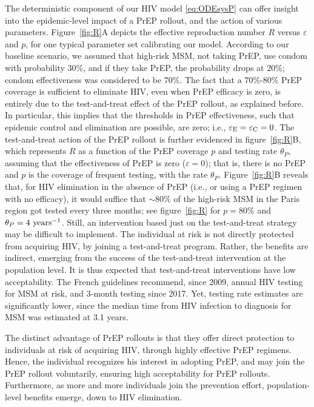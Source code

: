 \documentclass[11pt]{article}
\begin{document}
The deterministic component of our HIV model \eqref{eq:ODEsysP} can offer insight into the epidemic-level impact of a PrEP rollout, and the action of various parameters. Figure~\ref{fig:R}A depicts the effective reproduction number $R$ versus $\varepsilon$ and $p$, for one typical parameter set calibrating our model.  According to our baseline scenario, we assumed that high-risk MSM, not taking PrEP, use condom with probability $30\%$, and if they take PrEP, the probability drops at $20\%$; condom effectiveness was considered to be $70\%$. The fact that a $70\%$-$80\%$ PrEP coverage is sufficient to eliminate HIV, even when PrEP efficacy is zero, is entirely due to the test-and-treat effect of the PrEP rollout, as explained before. In particular, this implies that the thresholds in PrEP effectiveness, such that epidemic control and elimination are possible, are zero; i.e., $\varepsilon_{\rm E} = \varepsilon_{\rm C} = 0$. The test-and-treat action of the PrEP rollout is further evidenced in figure~\ref{fig:R}B, which represents $R$ as a function of the PrEP coverage $p$ and testing rate $\theta_P$, assuming that the effectiveness of PrEP is zero ($\varepsilon=0$); that is, there is no PrEP and $p$ is the coverage of frequent testing, with the rate $\theta_P$. Figure~\ref{fig:R}B reveals that, for HIV elimination in the absence of PrEP (i.e., or using a PrEP regimen with no efficacy), it would suffice that $\sim 80\%$ of the high-risk MSM in the Paris region got tested every three months; see figure~\ref{fig:R} for $p=80\%$ and $\theta_P=4~\rm{years^{-1}}$. Still, an intervention based just on the test-and-treat strategy may be difficult to implement. The individual at risk is not directly protected from acquiring HIV, by joining a test-and-treat program. Rather, the benefits are indirect, emerging from the success of the test-and-treat intervention at the population level. It is thus expected that test-and-treat interventions have low acceptability. The French guidelines recommend, since 2009, annual HIV testing for MSM at risk, and 3-month testing since 2017. Yet, testing rate estimates are significantly lower, since the median time from HIV infection to diagnosis for MSM was estimated at 3.1 years.~\cite{Marty2019}

The distinct advantage of PrEP rollouts is that they offer direct protection to individuals at risk of acquiring HIV, through highly effective PrEP regimens. Hence, the individual recognizes his interest in adopting PrEP, and may join the PrEP rollout voluntarily, ensuring high acceptability for PrEP rollouts. Furthermore, as more and more individuals join the prevention effort, population-level benefits emerge, down to HIV elimination.
\end{document}

